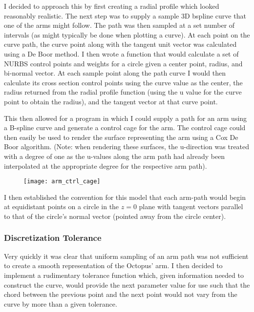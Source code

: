 \documentclass[twocolumn]{article}
\begin{document}
I decided to approach this by first creating a radial profile which looked reasonably realistic. The next step was to supply a sample 3D bspline curve that one of the arms might follow. The path was then sampled at a set number of intervals (as might typically be done when plotting a curve). At each point on the curve path, the curve point along with the tangent unit vector was calculated using a De Boor method. I then wrote a function that would calculate a set of NURBS control points and weights for a circle given a center point, radius, and bi-normal vector. At each sample point along the path curve I would then calculate its cross section control points using the curve value as the center, the radius returned from the radial profile function (using the u value for the curve point to obtain the radius), and the tangent vector at that curve point. 

This then allowed for a program in which I could supply a path for an arm using a B-spline curve and generate a control cage for the arm. The control cage could then easily be used to render the surface representing the arm using a Cox De Boor algorithm. (Note: when rendering these surfaces, the u-direction was treated with a degree of one as the u-values along the arm path had already been interpolated at the appropriate degree for the respective arm path).

\begin{figure}[h!]
\begin{center}
\texttt{[image: arm\_ctrl\_cage]}
\end{center}
\end{figure}

I then established the convention for this model that each arm-path would begin at equidistant points on a circle in the $z=0$ plane with tangent vectors parallel to that of the circle's normal vector (pointed away from the circle center).

\subsubsection{Discretization Tolerance}

Very quickly it was clear that uniform sampling of an arm path was not sufficient to create a smooth representation of the Octopus' arm. I then decided to implement a rudimentary tolerance function which, given information needed to construct the curve, would provide the next parameter value for use such that the chord between the previous point and the next point would not vary from the curve by more than a given tolerance.
\end{document}
